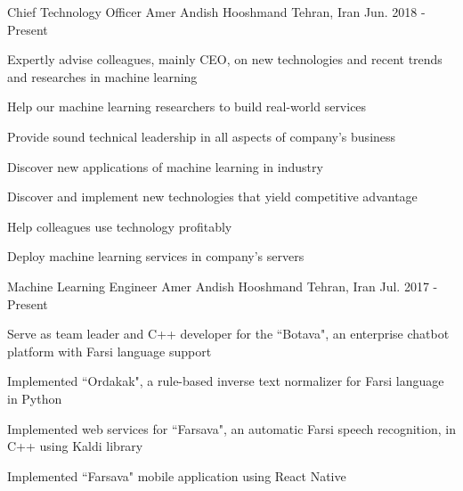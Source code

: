 

\begin{cventries}

  \cventry
    {Chief Technology Officer} %
    {Amer Andish Hooshmand} %
    {Tehran, Iran} %
    {Jun. 2018 - Present} %
    { 
      \begin{cvitems}
        \item Expertly advise colleagues, mainly CEO, on new technologies and recent trends and researches in machine learning
        \item Help our machine learning researchers to build real-world services
        \item {Provide sound technical leadership in all aspects of company's business} 
        \item {Discover new applications of machine learning in industry}
        \item {Discover and implement new technologies that yield competitive advantage}
        \item {Help colleagues use technology profitably}
        \item {Deploy machine learning services in company's servers}
      \end{cvitems}
    }

  \cventry
    {Machine Learning Engineer} %
    {Amer Andish Hooshmand} %
    {Tehran, Iran} %
    {Jul. 2017 - Present} %
    {
      \begin{cvitems} %
        \item {Serve as team leader and C++ developer for the ``Botava", an enterprise chatbot platform with Farsi language support}
        \item {Implemented ``Ordakak", a rule-based inverse text normalizer for Farsi language in Python}
        \item {Implemented web services for ``Farsava", an automatic Farsi speech recognition, in C++ using Kaldi library}
        \item {Implemented ``Farsava" mobile application using React Native}
      \end{cvitems}
    }


\end{cventries}
